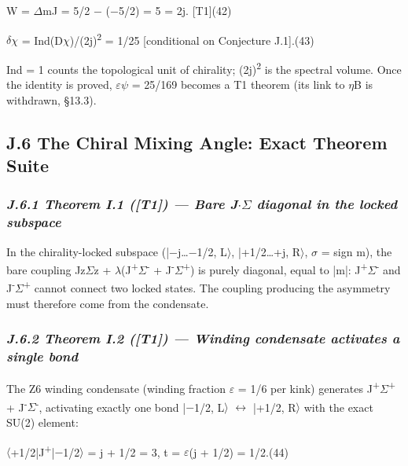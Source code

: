 \documentclass[11pt,letterpaper]{article}
\begin{document}
\begingroup\centering W = $\Delta$mJ = 5/2 $-$ ($-$5/2) = 5 = 2j.   [T1]\hspace{2em}(42)\par\endgroup

\begingroup\centering $\delta$$\chi$ = Ind(D$\chi$)/(2j)\textsuperscript{2} = 1/25  [conditional on Conjecture J.1].\hspace{2em}(43)\par\endgroup

\noindent Ind = 1 counts the topological unit of chirality; (2j)\textsuperscript{2} is the spectral volume. Once the identity is proved, $\varepsilon$$\psi$ = 25/169 becomes a T1 theorem (its link to $\eta$B is withdrawn, §13.3).

\subsection*{J.6  The Chiral Mixing Angle: Exact Theorem Suite}

\subsubsection*{\itshape J.6.1  Theorem I.1 ([T1]) --- Bare J$\cdot$$\Sigma$ diagonal in the locked subspace}

\noindent In the chirality-locked subspace (|$-$j\ldots{}$-$1/2, L$\rangle$, |+1/2\ldots{}+j, R$\rangle$, $\sigma$ = sign m), the bare coupling Jz$\Sigma$z + $\lambda$(J\textsuperscript{+}$\Sigma$\textsuperscript{-} + J\textsuperscript{-}$\Sigma$\textsuperscript{+}) is purely diagonal, equal to |m|: J\textsuperscript{+}$\Sigma$\textsuperscript{-} and J\textsuperscript{-}$\Sigma$\textsuperscript{+} cannot connect two locked states. The coupling producing the asymmetry must therefore come from the condensate.

\subsubsection*{\itshape J.6.2  Theorem I.2 ([T1]) --- Winding condensate activates a single bond}

\noindent The Z6 winding condensate (winding fraction $\varepsilon$ = 1/6 per kink) generates J\textsuperscript{+}$\Sigma$\textsuperscript{+} + J\textsuperscript{-}$\Sigma$\textsuperscript{-}, activating exactly one bond |$-$1/2, L$\rangle$ $\leftrightarrow$ |+1/2, R$\rangle$ with the exact SU(2) element:

\begingroup\centering $\langle$+1/2|J\textsuperscript{+}|$-$1/2$\rangle$ = j + 1/2 = 3,   t = $\varepsilon$(j + 1/2) = 1/2.\hspace{2em}(44)\par\endgroup
\end{document}
